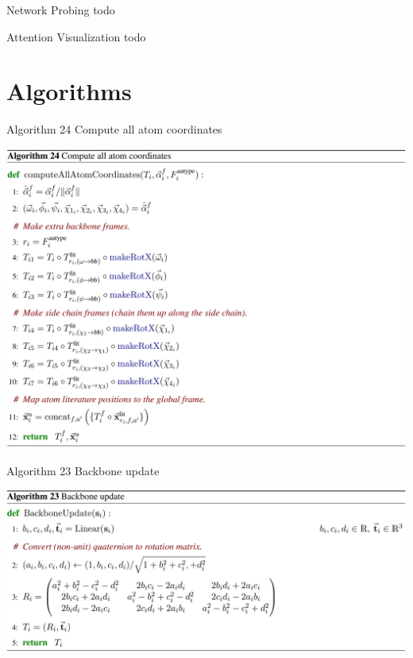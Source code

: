 \documentclass[presentation, smaller]{beamer}
\begin{document}
\begin{frame}[label={sec:org832561a}]{Network Probing \cite{jumperHighlyAccurateProtein2021}}
todo
\end{frame}

\begin{frame}[label={sec:orgc7aea41}]{Attention Visualization \cite{jumperHighlyAccurateProtein2021}}
todo
\end{frame}

\section*{Algorithms}
\label{sec:org070459f}
\begin{frame}[label={sec:org557465e}]{Algorithm 24 Compute all atom coordinates \cite{jumperHighlyAccurateProtein2021}}
\begin{center}
\includegraphics[width=.9\linewidth]{./imgs/all-atom-coords-algo.png}
\end{center}
\end{frame}
\begin{frame}[label={sec:org0170fe9}]{Algorithm 23 Backbone update \cite{jumperHighlyAccurateProtein2021}}
\begin{center}
\includegraphics[width=.9\linewidth]{./imgs/backbone-update-algo.png}
\end{center}
\end{frame}
\end{document}
